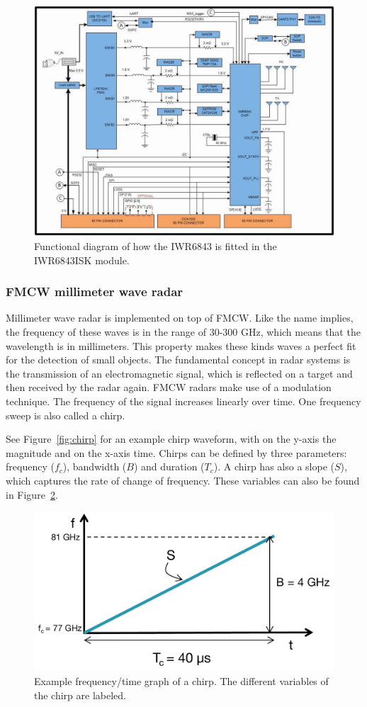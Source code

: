 \begin{figure}[t]
\centering
\includegraphics[width=\textwidth]{figures/background/iwr6843isk_connection.png}
\caption{Functional diagram of how the IWR6843 is fitted in the IWR6843ISK module.}
\label{fig:iwr6843_connection}
\end{figure}

\subsubsection{FMCW millimeter wave radar}
Millimeter wave radar is implemented on top of FMCW. Like the name implies, the frequency of these waves is in the range of 30-300 GHz, which means that the wavelength is in millimeters. This property makes these kinds waves a perfect fit for the detection of small objects.
The fundamental concept in radar systems is the transmission of an electromagnetic signal, which is reflected on a target and then received by the radar again. FMCW radars make use of a modulation technique. The frequency of the signal increases linearly over time. One frequency sweep is also called a chirp. 

See Figure~\ref{fig:chirp} for an example chirp waveform, with on the y-axis the magnitude and on the x-axis time. Chirps can be defined by three parameters: frequency ($f_c$), bandwidth ($B$) and duration ($T_c$). A chirp has also a slope ($S$), which captures the rate of change of frequency. These variables can also be found in Figure~\ref{fig:chirpfreqtime}.

\begin{figure}[t]
\centering
\includegraphics[width=.5\textwidth]{figures/background/chirp_params.png}
\caption{Example frequency/time graph of a chirp. The different variables of the chirp are labeled.}
\label{fig:chirpfreqtime}
\end{figure}

